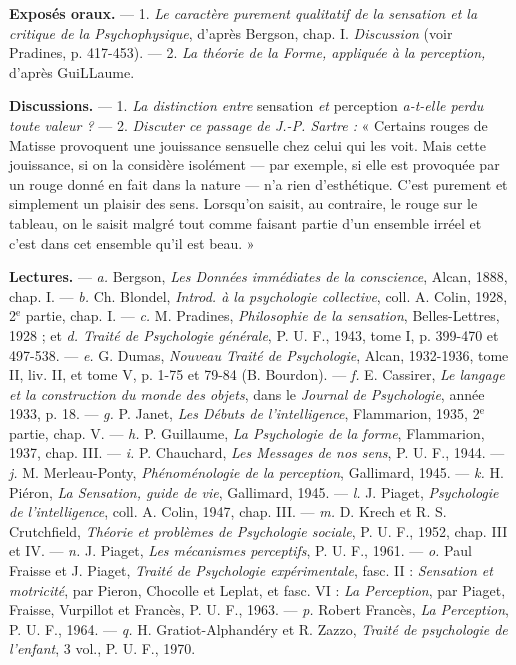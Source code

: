 
{\bf Exposés oraux.} — 1. {\it Le caractère purement qualitatif de la sensation et la
critique de la Psychophysique}, d’après Bergson, chap. I. {\it Discussion} (voir
Pradines, p. 417-453). — 2. {\it La théorie de la Forme, appliquée à la perception,}
d’après GuiLLaume.

{\bf Discussions.} — 1. {\it La distinction entre} sensation {\it et} perception {\it a-t-elle
perdu toute valeur ?} — 2. {\it Discuter ce passage de J.-P. Sartre :} « Certains
rouges de Matisse provoquent une jouissance sensuelle chez celui qui
les voit. Mais cette jouissance, si on la considère isolément — par exemple,
si elle est provoquée par un rouge donné en fait dans la nature — n’a rien
d'esthétique. C’est purement et simplement un plaisir des sens. Lorsqu'on
saisit, au contraire, le rouge sur le tableau, on le saisit malgré tout comme
faisant partie d’un ensemble irréel et c’est dans cet ensemble qu’il est beau. »

{\bf Lectures.} — {\it a.} Bergson, {\it Les Données immédiates de la conscience}, Alcan,
1888, chap. I. — {\it b.} Ch. Blondel, {\it Introd. à la psychologie collective}, coll.
A. Colin, 1928, 2$^\text{e}$ partie, chap. I. — {\it c.} M. Pradines, {\it Philosophie de la
sensation}, Belles-Lettres, 1928 ; et {\it d. Traité de Psychologie générale},
P. U. F., 1943, tome I, p. 399-470 et 497-538. — {\it e.} G. Dumas, {\it Nouveau
Traité de Psychologie}, Alcan, 1932-1936, tome II, liv. II, et tome V, p. 1-75
et 79-84 (B. Bourdon). — {\it f.} E. Cassirer, {\it Le langage et la construction du
monde des objets}, dans le {\it Journal de Psychologie}, année 1933, p. 18. —
{\it g.} P. Janet, {\it Les Débuts de l'intelligence}, Flammarion, 1935, 2$^\text{e}$ partie,
chap. V. — {\it h.} P. Guillaume, {\it La Psychologie de la forme}, Flammarion,
1937, chap. III. — {\it i.} P. Chauchard, {\it Les Messages de nos sens}, P. U. F.,
1944. — {\it j.} M. Merleau-Ponty, {\it Phénoménologie de la perception}, Gallimard,
1945. — {\it k.} H. Piéron, {\it La Sensation, guide de vie}, Gallimard, 1945.
— {\it l.} J. Piaget, {\it Psychologie de l'intelligence}, coll. A. Colin, 1947, chap. III. —
{\it m.} D. Krech et R. S. Crutchfield, {\it Théorie et problèmes de Psychologie
sociale}, P. U. F., 1952, chap. III et IV. — {\it n.} J. Piaget, {\it Les mécanismes
perceptifs}, P. U. F., 1961. — {\it o.} Paul Fraisse et J. Piaget, {\it Traité de Psychologie
expérimentale}, fasc. II : {\it Sensation et motricité}, par Pieron, Chocolle
et Leplat, et fasc. VI : {\it La Perception}, par Piaget, Fraisse, Vurpillot
et Francès, P. U. F., 1963. — {\it p.} Robert Francès, {\it La Perception}, P. U. F.,
1964. — {\it q.} H. Gratiot-Alphandéry et R. Zazzo, {\it Traité de psychologie de
l'enfant}, 3 vol., P. U. F., 1970.
